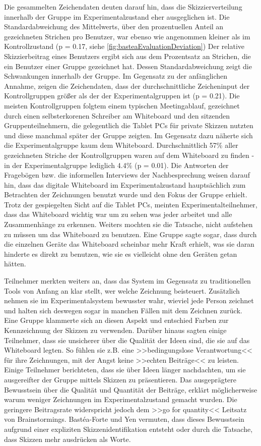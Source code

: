 \medskip Die gesammelten Zeichendaten deuten darauf hin, dass die Skizzierverteilung innerhalb der Gruppe im Experimentalzustand eher ausgeglichen ist. Die Standardabweichung des Mittelwerts, über den prozentuellen Anteil an gezeichneten Strichen pro Benutzer, war ebenso wie angenommen kleiner als im Kontrollzustand (p = 0.17, siehe \autoref{fig:basteaEvaluationDeviation})
Der relative Skizzierbeitrag eines Benutzers ergibt sich aus dem Prozentsatz an Strichen, die ein Benutzer einer Gruppe gezeichnet hat. Dessen Standardabweichung zeigt die Schwankungen innerhalb der Gruppe. Im Gegensatz zu der anfänglichen Annahme, zeigen die Zeichendaten, dass der durchschnittliche Zeicheninput der Kontrollgruppen größer als der der Experimentalgruppen ist (p = 0.21).
Die meisten Kontrollgruppen folgtem einem typischen Meetingablauf, gezeichnet durch einen selbsterkorenen Schreiber am Whiteboard und den sitzenden Gruppenteilnehmern, die gelegentlich die Tablet PCs für private Skizzen nutzten und diese manchmal später der Gruppe zeigten. Im Gegensatz dazu näherte sich die Experimentalgruppe kaum dem Whiteboard. Durchschnittlich 57\% aller gezeichneten Striche der Kontrollgruppen waren auf dem Whiteboard zu finden - in der Experimentalgruppe lediglich 4.4\% (p = 0.01). Die Antworten der Fragebögen bzw. die informellen Interviews der Nachbesprechung weisen darauf hin, dass das digitale Whiteboard im Experimentalzustand hauptsächlich zum Betrachten der Zeichnungen benutzt wurde und den Fokus der Gruppe erhielt. Trotz der gespiegelten Sicht auf die Tablet PCs, meinten Experimentalteilnehmer, dass das Whiteboard wichtig war um zu sehen was jeder arbeitet und alle Zusammenhänge zu erkennen. Weiters mochten sie die Tatsache, nicht aufstehen zu müssen um das Whiteboard zu benutzen. Eine Gruppe sagte sogar, dass durch die einzelnen Geräte das Whiteboard scheinbar mehr Kraft erhielt, was sie daran hinderte es direkt zu benutzen, wie sie es vielleicht ohne den Geräten getan hätten.

\medskip Teilnehmer merkten weiters an, dass das System im Gegensatz zu traditionellen Tools von Anfang an klar stellt, wer welche Zeichnung beisteuert. Zusätzlich nehmen sie im Experimentalsystem bewusster wahr, wieviel jede Person zeichnet und halten sich deswegen sogar in manchen Fällen mit dem Zeichnen zurück. Eine Gruppe klammerte sich an diesen Aspekt und entschied Farben zur Kennzeichnung der Skizzen zu verwenden. Darüber hinaus sagten einige Teilnehmer, dass sie unsicherer über die Qualität der Ideen sind, die sie auf das Whiteboard legten. So fühlen sie z.B. eine >>bedingungslose Verantwortung<< für ihre Zeichnungen, mit der Angst keine >>echten Beiträge<< zu leisten. Einige Teilnehmer berichteten, dass sie über Ideen länger nachdachten, um sie ausgereifter der Gruppe mittels Skizzen zu präsentieren.
Das ausgeprägtere Bewusstsein über die Qualität und Quantität der Beiträge, erklärt möglicherweise warum weniger Zeichnungen im Experimentalzustand gemacht wurden. Die geringere Beitragsrate widerspricht jedoch dem >>go for quantity<< Leitsatz von Brainstormings. Bastéa-Forte und Yen vermuten, dass dieses Bewusstsein aufgrund einer expliziten Skizzenidentifikation entsteht oder durch die Tatsache, dass Skizzen mehr ausdrücken als Worte. 


